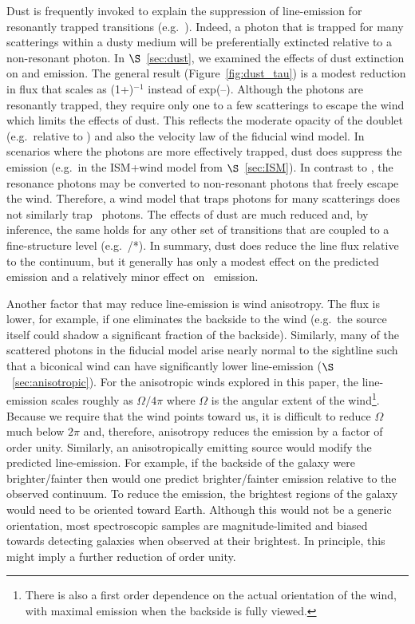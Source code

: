 \documentclass[12pt,preprint]{aastex}
\begin{document}
Dust is frequently invoked to explain the suppression of line-emission
for resonantly trapped transitions (e.g.\ \lya).  Indeed, a photon
that is trapped for many scatterings within a dusty medium will 
be preferentially extincted relative to a non-resonant photon.  In
$\S$~\ref{sec:dust}, we examined the effects of dust extinction on 
 and  emission.  The general result
(Figure~\ref{fig:dust_tau}) is a modest
reduction in flux that scales as (1+\taud)$^{-1}$ instead of
exp(--\taud). Although the  photons are resonantly
trapped, they require only one to a few scatterings
to escape the wind which limits the effects of
dust.  This reflects the moderate opacity of the 
doublet (e.g.\ relative to \lya) and also the velocity law of the
fiducial wind model.
In scenarios where the  photons are
more effectively trapped, dust does suppress
the emission (e.g.\ in the ISM+wind model from $\S$~\ref{sec:ISM}).
In contrast to , 
the  resonance photons may be
converted to non-resonant photons that freely escape the wind.
Therefore, a wind model that traps 
photons for many scatterings does not similarly trap 
\feiid\ photons.  The effects of dust are much 
reduced and, by inference, the same holds for any other set of
transitions that are coupled to a fine-structure level (e.g.\
/*).  In summary,
dust does reduce the line flux relative to the continuum, but 
it generally has only a modest effect on the predicted 
emission and a relatively minor effect on \feiis\ emission.

Another factor that may reduce line-emission is %
wind %
anisotropy. The flux is lower, for example, if one
eliminates the backside to the wind (e.g.\ the source itself could
shadow a significant fraction of the backside).  
Similarly, 
many of the scattered photons in the fiducial 
model arise nearly normal to the sightline such that a biconical
wind can have significantly lower line-emission
($\S$~\ref{sec:anisotropic}). 
For the anisotropic winds explored in this paper,
the line-emission scales 
roughly as $\Omega/4\pi$ where $\Omega$ is the angular extent of the
wind\footnote{There is also a first order dependence on the actual
  orientation of the wind, with maximal emission when the backside is
  fully viewed.}.  Because we require that the wind 
points toward us, it is difficult to reduce $\Omega$ much
below $2 \pi$ and, therefore, anisotropy reduces the
emission by a factor of order unity.  
Similarly, an anisotropically emitting source would modify the predicted
line-emission.  For example, if the backside of the galaxy were
brighter/fainter then would one predict brighter/fainter emission
relative to the observed continuum.
To reduce the emission, the brightest regions
of the galaxy would need to be oriented toward Earth.  Although this
would not be a
generic orientation, most spectroscopic samples are magnitude-limited
and biased towards detecting galaxies when observed at their
brightest.  In principle, this might imply a further
reduction of order unity.
\end{document}
